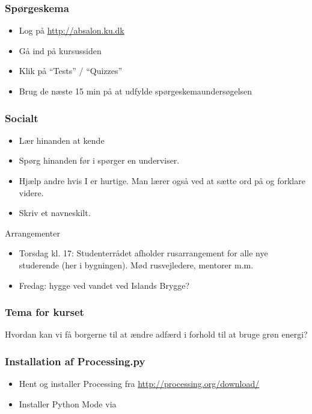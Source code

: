\documentclass[10pt]{beamer}
\begin{document}
\begin{frame}
  \frametitle{Spørgeskema}
  \begin{itemize}
  \item Log på \url{http://absalon.ku.dk}
  \item Gå ind på kursussiden
  \item Klik på ``Tests'' / ``Quizzes''
  \item Brug de næste 15 min på at udfylde spørgeskemaundersøgelsen
  \end{itemize}

\end{frame}

\begin{frame}
  \frametitle{Socialt}
  \begin{itemize}
  \item Lær hinanden at kende
  \item Spørg hinanden før i spørger en underviser.
  \item Hjælp andre hvis I er hurtige. Man lærer også ved at sætte ord
    på og forklare videre.
  \item Skriv et navneskilt.
  \end{itemize}

  \vspace{1cm}
  Arrangementer
  \begin{itemize}
  \item Torsdag kl. 17: Studenterrådet afholder rusarrangement for
    alle nye studerende (her i bygningen). Mød rusvejledere, mentorer m.m.
  \item Fredag: hygge ved vandet ved Islands Brygge?
  \end{itemize}
\end{frame}

\begin{frame}
  \frametitle{Tema for kurset}
     Hvordan kan vi få borgerne til at ændre
     adfærd i forhold til at bruge grøn energi?
  

\end{frame}

\begin{frame}
  \frametitle{Installation af Processing.py}

  \begin{itemize}
  \item Hent og installer Processing fra \url{http://processing.org/download/}
  \item Installer Python Mode via
  \end{itemize}
\end{frame}
\end{document}
